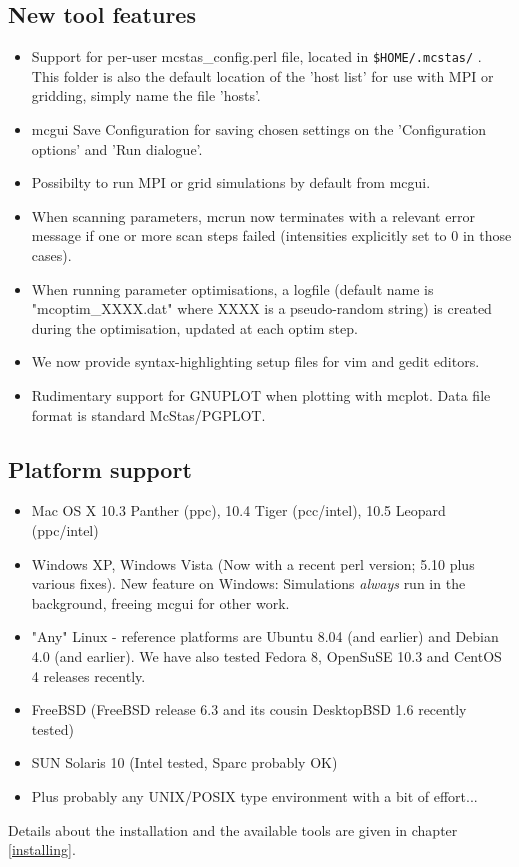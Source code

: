 \subsection{New tool features}
\begin{itemize}
  \item Support for per-user mcstas\_config.perl file, located in \verb+$HOME/.mcstas/+ . This folder is also the default
     location of the 'host list' for use with MPI or gridding, simply name the file 'hosts'.
  \item mcgui Save Configuration for saving chosen settings on the 'Configuration options' and 'Run dialogue'.
  \item Possibilty to run MPI or grid simulations by default from mcgui.
  \item When scanning parameters, mcrun now terminates with a relevant error message if one or more scan steps
     failed (intensities explicitly set to 0 in those cases).
  \item When running parameter optimisations, a logfile (default name is "mcoptim\_XXXX.dat" where XXXX is a
     pseudo-random string) is created during the optimisation, updated at each optim step.
  \item We now provide syntax-highlighting setup files for vim and gedit editors.
  \item Rudimentary support for GNUPLOT when plotting with mcplot. Data file format is standard McStas/PGPLOT.
\end{itemize}
\subsection{Platform support}
\begin{itemize}
\item Mac OS X 10.3 Panther (ppc), 10.4 Tiger (pcc/intel), 10.5 Leopard (ppc/intel)
\item Windows XP,  Windows Vista (Now with a recent perl version; 5.10 plus various fixes). New feature on Windows:
     Simulations \emph{always} run in the background, freeing mcgui for other work.
\item "Any" Linux - reference platforms are Ubuntu 8.04 (and earlier) and Debian 4.0 (and earlier). We have also tested 
  Fedora 8, OpenSuSE 10.3 and CentOS 4 releases recently.
\item FreeBSD (FreeBSD release 6.3 and its cousin DesktopBSD 1.6 recently tested)
\item SUN Solaris 10 (Intel tested, Sparc probably OK)
\item Plus probably any UNIX/POSIX type environment with a bit of effort...
\end{itemize}
Details about the installation and the available tools are given in chapter \ref{installing}.

